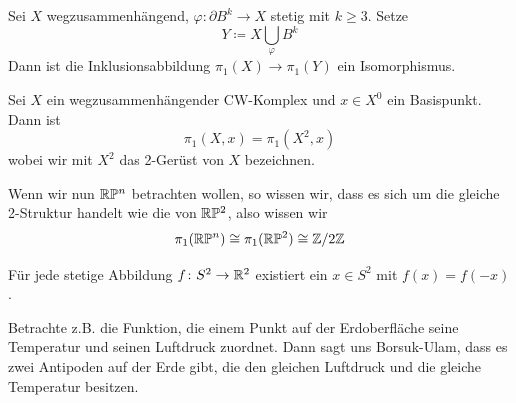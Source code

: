 \begin{theorem}
    Sei $X$ wegzusammenhängend,  $\varphi\colon  \partial B^k \to  X$ stetig mit $k\geq 3$. Setze
    \[
    Y \coloneqq  X \bigcup_{\varphi} B^k
    \] 
    Dann ist die Inklusionsabbildung $\pi_1(X) \to  \pi_1(Y)$ ein Isomorphismus.
\end{theorem}

\begin{corollary}
    Sei $X$ ein wegzusammenhängender CW-Komplex und  $x\in X^0$ ein Basispunkt. Dann ist
    \[
        \pi_1(X, x) = \pi_1(X^2,x)
    \] 
    wobei wir mit $X^2$ das 2-Gerüst von $X$ bezeichnen.
\end{corollary}

\begin{example}
    Wenn wir nun $\mathbb{R}\mathbb{P}^n$ betrachten wollen, so wissen wir, dass es sich um die gleiche 2-Struktur handelt wie die von $\mathbb{R}\mathbb{P}^2$, also wissen wir
    \[
        \pi_1(\mathbb{R}\mathbb{P}^n) \cong \pi_1(\mathbb{R}\mathbb{P}^2) \cong  \mathbb{Z} / 2 \mathbb{Z}
    \] 
\end{example}

\begin{theorem}
    Für jede stetige Abbildung $f\colon  S^2 \to  \mathbb{R}^2$ existiert ein $x\in S^2$ mit $f(x) = f(-x)$.
\end{theorem}

\begin{example}
    Betrachte z.B. die Funktion, die einem Punkt auf der Erdoberfläche seine Temperatur und seinen Luftdruck zuordnet. Dann sagt uns Borsuk-Ulam, dass es zwei Antipoden auf der Erde gibt, die den gleichen Luftdruck und die gleiche Temperatur besitzen.
\end{example}

